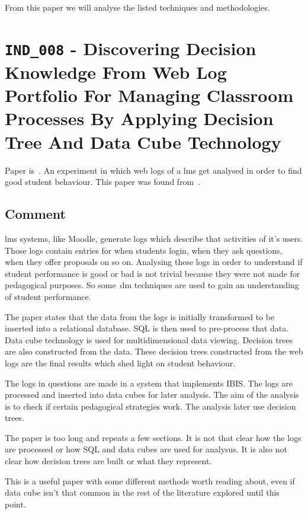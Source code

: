 From this paper we will analyse the listed techniques and methodologies.

\section{\texttt{IND\_008} - Discovering Decision Knowledge From Web Log
Portfolio For Managing Classroom Processes By Applying Decision Tree And Data
Cube Technology}

Paper is~\cite{ind_008}. An experiment in which web logs of a \gls{lms} get
analysed in order to find good student behaviour. This paper was found
from~\cite{ind_007}.

\subsection{Comment}

\gls{lms} systems, like Moodle, generate logs which describe that activities of
it's users. Those logs contain entries for when students login, when they ask
questions, when they offer proposals on so on. Analysing these logs in order to
understand if student performance is good or bad is not trivial because they
were not made for pedagogical purposes. So some~\gls{dm} techniques are used to
gain an understanding of student performance.

The paper states that the data from the logs is initially transformed to be
inserted into a relational database. SQL is then used to pre-process that data.
Data cube technology is used for multidimensional data viewing. Decision trees
are also constructed from the data. These decision trees constructed from the
web logs are the final results which shed light on student behaviour.

The logs in questions are made in a system that implements IBIS. The logs are
processed and inserted into data cubes for later analysis. The aim of the
analysis is to check if certain pedagogical strategies work. The analysis later
use decision trees.

The paper is too long and repeats a few sections. It is not that clear how the
logs are processed or how SQL and data cubes are used for analysus. It is also
not clear how decision trees are built or what they represent.

This is a useful paper with some different methods worth reading about, even if
data cube isn't that common in the rest of the literature explored until this
point.

